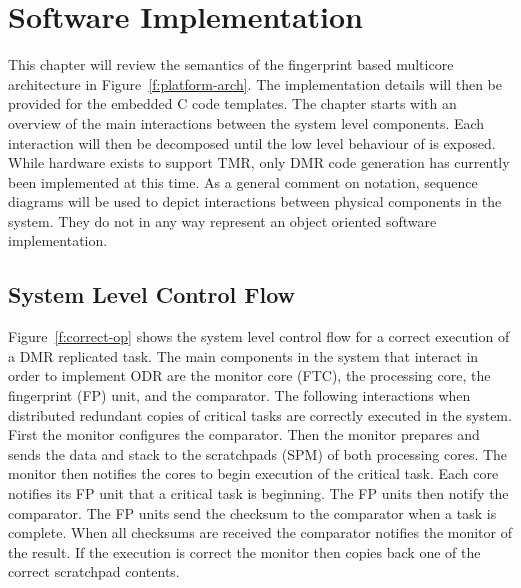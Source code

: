 
\chapter{Software Implementation} %

\label{c:soft-impl} %

	This chapter will review the semantics of the fingerprint based multicore architecture in Figure~\ref{f:platform-arch}. 
	The implementation details will then be provided for the embedded C code templates. 
	The chapter starts with an overview of the main interactions between the system level components. 
	Each interaction will then be decomposed until the low level behaviour of is exposed. While hardware exists to support TMR, only DMR code generation has currently been implemented at this time. 
	As a general comment on notation, sequence diagrams will be used to depict interactions between physical components in the system. They do not in any way represent an object oriented software implementation. 


\section{System Level Control Flow}
		
	Figure~\ref{f:correct-op} shows the system level control flow for a correct execution of a DMR replicated task.
	The main components in the system that interact in order to implement ODR are the monitor core (FTC), the processing core, the fingerprint (FP) unit, and the comparator. 
	The following interactions when distributed redundant copies of critical tasks are correctly executed in the system. 
	First the monitor configures the comparator. 
	Then the monitor prepares and sends the data and stack to the scratchpads (SPM) of both processing cores. 
	The monitor then notifies the cores to begin execution of the critical task. 
	Each core notifies its FP unit that a critical task is beginning. 
	The FP units then notify the comparator. 
	The FP units send the checksum to the comparator when a task is complete. 
	When all checksums are received the comparator notifies the monitor of the result. 
	If the execution is correct the monitor then copies back one of the correct scratchpad contents. 

